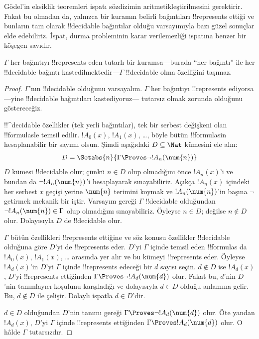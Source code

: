 \documentclass[../../../include/open-logic-section]{subfiles}
\begin{document}


G\"odel'in eksiklik teoremleri ispatı sözdizimin aritmetikleştirilmesini
gerektirir. Fakat bu olmadan da, yalnızca bir kuramın belirli bağıntıları
!!{represents} ettiği ve bunların tam olarak !!{decidable} bağıntılar
olduğu varsayımıyla bazı güzel sonuçlar elde
edebiliriz. İspat, durma probleminin karar verilemezliği ispatına benzer bir
köşegen savıdır.

\begin{thm}
$\Gamma$ her bağıntıyı !!{represents} eden tutarlı bir kuramsa---burada
``her bağıntı'' ile her !!{decidable} bağıntı kastedilmektedir---$\Gamma$
!!{decidable} olma özelliğini taşımaz.
\end{thm}

\begin{proof}
$\Gamma$'nın !!{decidable} olduğunu varsayalım. $\Gamma$ her bağıntıyı
!!{represents} ediyorsa---yine !!{decidable} bağıntıları kastediyoruz---
tutarsız olmak zorunda olduğunu göstereceğiz.

!!^{decidable} özellikler (tek yerli bağıntılar), tek bir serbest değişkeni
olan !!{formula}s{}le temsil edilir. $!A_0(x)$, $!A_1(x)$, \dots, böyle
bütün !!{formula}s{}in hesaplanabilir bir sayımı olsun. Şimdi aşağıdaki
$D \subseteq \Nat$ kümesini ele alın:
\[
D = \Setabs{n}{\Gamma \Proves \lnot !A_n(\num{n})}
\]
$D$ kümesi !!{decidable} olur; çünkü $n \in D$ olup olmadığını önce
$!A_n(x)$'i ve bundan da $\lnot !A_n(\num{n})$'i hesaplayarak sınayabiliriz.
Açıkça $!A_n(x)$ içindeki her serbest $x$ geçişi yerine $\num{n}$ terimini
koymak ve $!A_n(\num{n})$'in başına $\lnot$ getirmek mekanik bir iştir.
Varsayım gereği $\Gamma$ !!{decidable} olduğundan
$\lnot !A_n(\num{n}) \in \Gamma$ olup olmadığını sınayabiliriz. Öyleyse
$n \in D$; değilse $n \notin D$ olur. Dolayısıyla $D$ de !!{decidable} olur.

$\Gamma$ bütün özellikleri !!{represents} ettiğine ve söz konusu özellikler
!!{decidable} olduğuna göre $D$'yi de !!{represents} eder. $D$'yi
$\Gamma$ içinde temsil eden !!{formula}s da $!A_0(x)$, $!A_1(x)$, \dots
arasında yer alır ve bu kümeyi !!{represents} eder. Öyleyse $!A_d(x)$'in
$D$'yi $\Gamma$ içinde !!{represents} edeceği bir $d$ sayısı
seçin. $d \notin D$ ise $!A_d(x)$, $D$'yi !!{represents} ettiğinden
$\Gamma \Proves \lnot !A_d(\num{d})$ olur. Fakat bu, $d$'nin $D$'nin
tanımlayıcı koşulunu karşıladığı ve dolayısıyla $d \in D$ olduğu anlamına
gelir. Bu, $d \notin D$ ile çelişir. Dolaylı ispatla $d \in D$'dir.

$d \in D$ olduğundan $D$'nin tanımı gereği
$\Gamma \Proves \lnot !A_d(\num{d})$ olur. Öte yandan $!A_d(x)$, $D$'yi
$\Gamma$ içinde !!{represents} ettiğinden $\Gamma \Proves !A_d(\num{d})$
olur. O hâlde $\Gamma$ tutarsızdır.
\end{proof}
\end{document}
